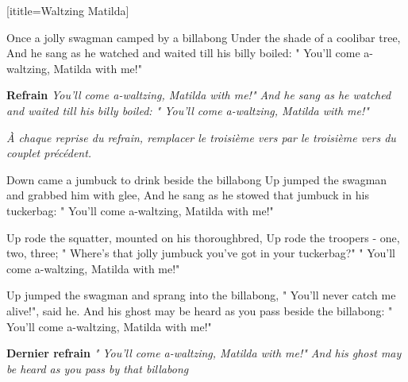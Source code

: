 [ititle=Waltzing Matilda]


\beginverse
Once a jolly swagman camped by a billabong
Under the shade of a coolibar tree,
And he sang as he watched and waited till his billy boiled:
" You'll come a-waltzing, Matilda with me!"
\endverse

\beginchorus
\textbf{Refrain}
\textit{
	You'll come a-waltzing, Matilda with me!"
	And he sang as he watched and waited till his billy boiled:
	" You'll come a-waltzing, Matilda with me!"}
\endchorus

\emph{À chaque reprise du refrain, remplacer le troisième vers par le troisième vers du couplet précédent.}

\beginverse
Down came a jumbuck to drink beside the billabong
Up jumped the swagman and grabbed him with glee,
And he sang as he stowed that jumbuck in his tuckerbag:
" You'll come a-waltzing, Matilda with me!"
\endverse

\beginverse
Up rode the squatter, mounted on his thoroughbred,
Up rode the troopers - one, two, three;
" Where's that jolly jumbuck you've got in your tuckerbag?"
" You'll come a-waltzing, Matilda with me!"
\endverse

\beginverse
Up jumped the swagman and sprang into the billabong,
" You'll never catch me alive!", said he.
And his ghost may be heard as you pass beside the billabong:
" You'll come a-waltzing, Matilda with me!"
\endverse

\beginchorus
\textbf{Dernier refrain}
\textit{
	" You'll come a-waltzing, Matilda with me!"
	And his ghost may be heard as you pass by that billabong
	}
\endchorus
\endsong